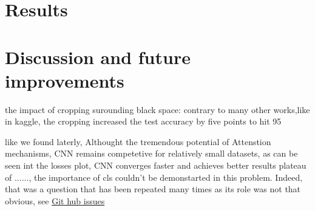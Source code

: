 \section{Results}


\section{Discussion and future improvements}
the impact of cropping surounding black space: contrary to many other works,like in kaggle, the cropping increased the test accuracy by five points to hit 95%

like we found laterly, Althought the tremendous potential of Attenstion mechanisms, CNN remains competetive for relatively small datasets, as can be seen int the losses plot, CNN converges faster and achieves better results plateau of $......$, 
the importance of cls couldn't be demonstarted in this problem. Indeed, that was a question that has been repeated many times as its role was not that obvious, see \href{https://github.com/google-research/vision_transformer/issues/61#issuecomment-802233921}{Git hub issues}












